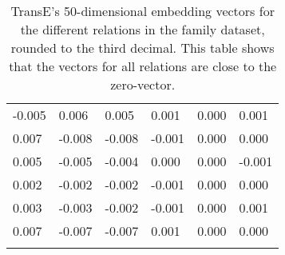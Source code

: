 \begin{longtable}{llllll}
-0.005 & 0.006  & 0.005  & 0.001    & 0.000   & 0.001  \\
0.007  & -0.008 & -0.008 & -0.001   & 0.000   & 0.000  \\
0.005  & -0.005 & -0.004 & 0.000    & 0.000   & -0.001 \\
0.002  & -0.002 & -0.002 & -0.001   & 0.000   & 0.000  \\
0.003  & -0.003 & -0.002 & -0.001   & 0.000   & 0.001  \\
0.007  & -0.007 & -0.007 & 0.001    & 0.000   & 0.000  \\ \hline
\caption[TransE embedding vector family KG]{TransE's 50-dimensional embedding vectors for the different relations in the family dataset, rounded to the third decimal. This table shows that the vectors for all relations are close to the zero-vector.}
\label{TransE_embedding_family}
\end{longtable}


